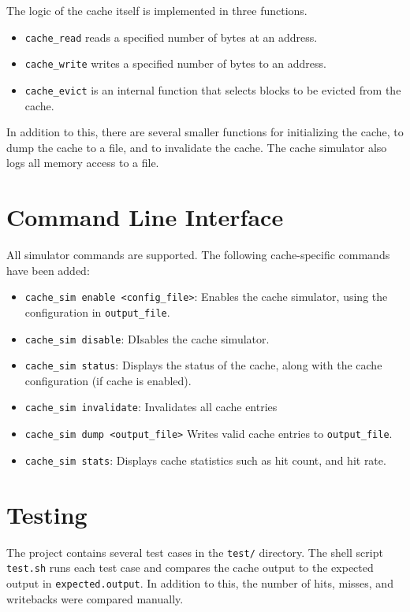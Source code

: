 \documentclass{article}
\begin{document}
The logic of the cache itself is implemented in three functions.
\begin{itemize}
    \item \texttt{cache\_read} reads a specified number of bytes at an address. 
    \item \texttt{cache\_write} writes a specified number of bytes to an address.
    \item \texttt{cache\_evict} is an internal function that selects blocks to be
    evicted from the cache.
\end{itemize}

In addition to this, there are several smaller functions for initializing
the cache, to dump the cache to a file, and to invalidate the cache.
The cache simulator also logs all memory access to a file.

\section{Command Line Interface}

    All simulator commands are supported. The following cache-specific commands have been added:
\begin{itemize}
    \item \texttt{cache\_sim enable <config\_file>}: Enables the cache simulator, using
    the configuration in \texttt{output\_file}.
    \item \texttt{cache\_sim disable}: DIsables the cache simulator.
    \item \texttt{cache\_sim status}: Displays the status of the cache, along with the
    cache configuration (if cache is enabled).
    \item \texttt{cache\_sim invalidate}: Invalidates all cache entries
    \item \texttt{cache\_sim dump <output\_file>} Writes valid cache entries to
    \texttt{output\_file}.
    \item \texttt{cache\_sim stats}: Displays cache statistics such as hit count,
    and hit rate.
\end{itemize}

\section{Testing}

The project contains several test cases in the \texttt{test/} directory. The 
shell script \texttt{test.sh} runs each test case and compares the cache output
to the expected output in \texttt{expected.output}. In addition to this, the number
of hits, misses, and writebacks were compared manually.
\end{document}
